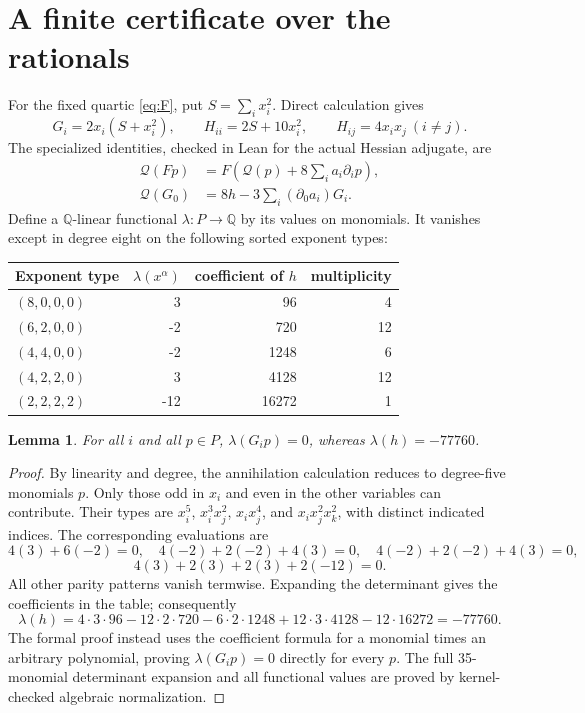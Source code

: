 \documentclass[11pt,letterpaper]{article}
\newtheorem{lemma}[theorem]{Lemma}
\theoremstyle{remark}\newtheorem{remark}[theorem]{Remark}
\newcommand{\QQ}{\mathbb Q}
\begin{document}
\section{A finite certificate over the rationals}\label{sec:finite}
For the fixed quartic \eqref{eq:F}, put \(S=\sum_i x_i^2\). Direct calculation
gives
\[
 G_i=2x_i(S+x_i^2),\qquad
 H_{ii}=2S+10x_i^2,\qquad H_{ij}=4x_ix_j\ (i\ne j).
\]
The specialized identities, checked in Lean for the actual Hessian adjugate,
are
\begin{align}
 \mathcal Q(Fp)&=F\left(\mathcal Q(p)+8\sum_i a_i\partial_ip\right),\label{eq:concretedescent}\\
 \mathcal Q(G_0)&=8h-3\sum_i(\partial_0a_i)G_i.\label{eq:concreteescape}
\end{align}
Define a \(\QQ\)-linear functional \(\lambda:P\to\QQ\) by its values on
monomials. It vanishes except in degree eight on the following sorted
exponent types:
\begin{center}
\begin{tabular}{lrrr}
\toprule
Exponent type & \(\lambda(x^\alpha)\) & coefficient of \(h\) & multiplicity\\
\midrule
\((8,0,0,0)\) & 3 & 96 & 4\\
\((6,2,0,0)\) & -2 & 720 & 12\\
\((4,4,0,0)\) & -2 & 1248 & 6\\
\((4,2,2,0)\) & 3 & 4128 & 12\\
\((2,2,2,2)\) & -12 & 16272 & 1\\
\bottomrule
\end{tabular}
\end{center}
\begin{lemma}\label{lem:finite}
For all \(i\) and all \(p\in P\), \(\lambda(G_ip)=0\), whereas
\(\lambda(h)=-77760\).
\end{lemma}
\begin{proof}
By linearity and degree, the annihilation calculation reduces to degree-five
monomials \(p\). Only those odd in \(x_i\) and even in the other variables
can contribute. Their types are \(x_i^5\), \(x_i^3x_j^2\),
\(x_ix_j^4\), and \(x_ix_j^2x_k^2\), with distinct indicated indices.
The corresponding evaluations are
\[
 4(3)+6(-2)=0,\quad
 4(-2)+2(-2)+4(3)=0,\quad
 4(-2)+2(-2)+4(3)=0,
\]
\[
 4(3)+2(3)+2(3)+2(-12)=0.
\]
All other parity patterns vanish termwise. Expanding the determinant gives
the coefficients in the table; consequently
\[
 \lambda(h)=4\cdot3\cdot96-12\cdot2\cdot720-6\cdot2\cdot1248
            +12\cdot3\cdot4128-12\cdot16272=-77760.
\]
The formal proof instead uses the coefficient formula for a monomial times
an arbitrary polynomial, proving \(\lambda(G_ip)=0\) directly for every
\(p\). The full 35-monomial determinant expansion and all functional values
are proved by kernel-checked algebraic normalization.
\end{proof}
\end{document}
